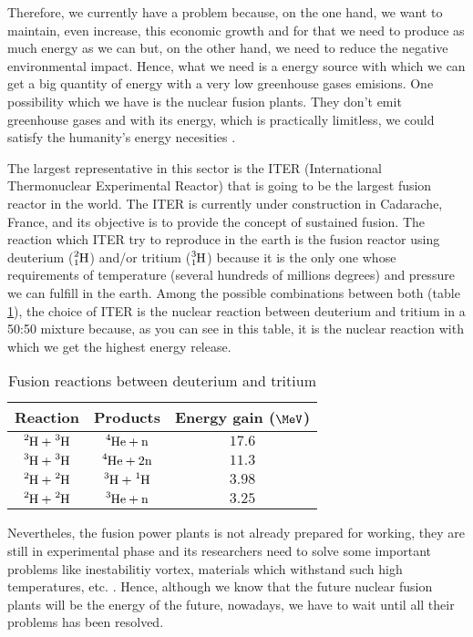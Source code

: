 Therefore, we currently have a problem because, on the one hand, we want to maintain, even increase, this economic growth and for that we need to produce as much energy as we can but, on the other hand, we need to reduce the negative environmental impact. Hence, what we need is a energy source with which we can get a big quantity of energy with a very low greenhouse gases emisions. One possibility which we have is the nuclear fusion plants. They don't emit greenhouse gases and with its energy, which is practically limitless, we could satisfy the humanity's energy necesities .

The largest representative in this sector is the ITER \cite{ITER} (International Thermonuclear Experimental Reactor) that is going to be the largest fusion reactor in the world. The ITER is currently under construction in Cadarache, France, and its objective is to provide the concept of sustained fusion. The reaction which ITER try to reproduce in the earth is the fusion reactor using deuterium ($\ce{^{2}_{1}H}$) and/or tritium ($\ce{^{3}_{1}H}$) because it is the only one whose requirements of temperature (several hundreds of millions degrees) and pressure we can fulfill in the earth. Among the possible combinations between both (table \ref{tab:FusionReactions}), the choice of ITER is the nuclear reaction between deuterium and tritium in a 50:50 mixture because, as you can see in this table,  it is the nuclear reaction with which we get the highest energy release. 

\begin{table}[htbp]
\begin{center}
\begin{tabular}{|c|c|c|}
\hline
Reaction & Products & Energy gain ($\MeV$) \\
\hline \hline \hline
$\ce{^{2}H}+\ce{^{3}H}$ & $\ce{^{4}He}+\ce{n}$ & $17.6$ \\ \hline
$\ce{^{3}H}+\ce{^{3}H}$ & $\ce{^{4}He}+2\ce{n}$ & $11.3$ \\ \hline
$\ce{^{2}H}+\ce{^{2}H}$ & $\ce{^{3}H}+\ce{^{1}H}$ & $3.98$ \\ \hline
$\ce{^{2}H}+\ce{^{2}H}$ & $\ce{^{3}He}+\ce{n}$ & $3.25$ \\ \hline
\end{tabular}
\caption{Fusion reactions between deuterium and tritium\cite{TritiumDocument}}
\label{tab:FusionReactions}
\end{center}
\end{table}

Nevertheles, the fusion power plants is not already prepared for working,  they are still in experimental phase and its researchers need to solve some important problems like inestabilitiy vortex, materials which withstand such high temperatures, etc. \cite{FusionCourse}. Hence, although we know that the future nuclear fusion plants will be the energy of the future, nowadays, we have to wait until all their problems has been resolved.

